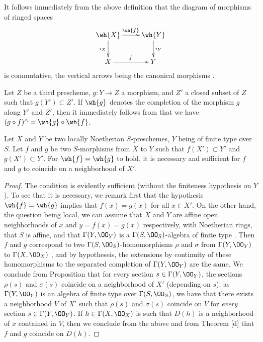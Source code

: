 \begin{env}[10.9.2]
\label{1.10.9.2}
It follows immediately from the above definition that the diagram of morphisms of ringed spaces
\[
  \xymatrix{
    \wh{X}\ar[r]^{\wh{f}}\ar[d]_{i_X} &
    \wh{Y}\ar[d]^{i_Y}\\
    X\ar[r]^f &
    Y
  }
\]
is commutative, the vertical arrows being the canonical morphisms .
\end{env}

\begin{env}[10.9.3]
\label{1.10.9.3}
Let $Z$ be a third prescheme, $g:Y\to Z$ a morphism, and $Z'$ a closed subset of $Z$ such that $g(Y')\subset Z'$.
If $\wh{g}$ denotes the completion of the morphism $g$ along $Y'$ and $Z'$, then it immediately follows from  that we have $(g\circ f)^\wedge=\wh{g}\circ\wh{f}$.
\end{env}

\begin{prop}[10.9.4]
\label{1.10.9.4}
Let $X$ and $Y$ be two locally Noetherian $S$-preschemes, $Y$ being of finite type over $S$.
Let $f$ and $g$ be two $S$-morphisms from $X$ to $Y$ such that $f(X')\subset Y'$ and $g(X')\subset Y'$.
For $\wh{f}=\wh{g}$ to hold, it is necessary and sufficient for $f$ and $g$ to coincide on a neighborhood of $X'$.
\end{prop}

\begin{proof}
\label{proof-1.10.9.4}
The condition is evidently sufficient (without the finiteness hypothesis on $Y$).
To see that it is necessary, we remark first that the hypothesis $\wh{f}=\wh{g}$ implies that $f(x)=g(x)$ for all $x\in X'$.
On the other hand, the question being local, we can assume that $X$ and $Y$ are affine open neighborhoods of $x$ and $y=f(x)=g(x)$ respectively, with Noetherian rings, that $S$ is affine, and that $\Gamma(Y,\OO_Y)$ is a $\Gamma(S,\OO_S)$-algebra of finite type .
Then $f$ and $g$ correspond to two $\Gamma(S,\OO_S)$-homomorphisms $\rho$ and $\sigma$ from $\Gamma(Y,\OO_Y)$ to $\Gamma(X,\OO_X)$ , and by hypotheseis, the extensions by continuity of these homomorphisms to the separated completion of $\Gamma(Y,\OO_Y)$ are the same.
We conclude from Proposition  that for every section $s\in\Gamma(Y,\OO_Y)$, the sections $\rho(s)$ and $\sigma(s)$ coincide on a neighborhood of $X'$ (depending on $s$); as $\Gamma(Y,\OO_Y)$ is an algebra of finite type over $\Gamma(S,\OO_S)$, we have that there exists a neighborhood $V$ of $X'$ such that $\rho(s)$ and $\sigma(s)$ coincide on $V$ for \emph{every} section $s\in\Gamma(Y,\OO_Y)$.
If $h\in\Gamma(X,\OO_X)$ is such that $D(h)$ is a neighborhood of $x$ contained in $V$, then we conclude from the above and from Theorem [d] that $f$ and $g$ coincide on $D(h)$.
\end{proof}

